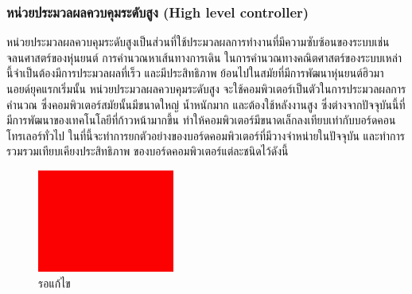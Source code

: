 \subsubsection*{หน่วยประมวลผลควบคุมระดับสูง (High level controller)}
หน่วยประมวลผลควบคุมระดับสูงเป็นส่วนที่ใช้ประมวลผลการทำงานที่มีความซับซ้อนของระบบเช่น
จลนศาสตร์ของหุ่นยนต์ การคำนวณหาเส้นทางการเดิน ในการคำนวณทางคณิตศาสตร์ของระบบเหล่านี้จำเป็นต้องมีการประมวลผลที่เร็ว
และมีประสิทธิภาพ ย้อนไปในสมัยที่มีการพัฒนาหุ่นยนต์ฮิวมานอยด์ยุคแรกเริ่มนั้น หน่วยประมวลผลควบคุมระดับสูง
จะใช้คอมพิวเตอร์เป็นตัวในการประมวลผลการคำนวณ ซึ่งคอมพิวเตอร์สมัยนั้นมีขนาดใหญ่ น้ำหนักมาก
และต้องใช้หลังงานสูง ซึ่งต่างจากปัจจุบันนี้ที่มีการพัฒนาของเทคโนโลยีที่ก้าวหน้ามากขึ้น
ทำให้คอมพิวเตอร์มีขนาดเล็กลงเทียบเท่ากับบอร์ดคอนโทรเลอร์ทั่วไป ในที่นี้จะทำการยกตัวอย่างของบอร์ดคอมพิวเตอร์ที่มีวางจำหน่ายในปัจจุบัน
และทำการรวมรวมเทียบเคียงประสิทธิภาพ ของบอร์ดคอมพิวเตอร์แต่ละชนิดไว้ดังนี้
\begin{figure}[htbp]
    \centering
    \includegraphics[width=0.40\textwidth]{chapter2/images/toedit.jpg}
    \caption{รอแก้ไข}
    \label{fig:toedit}
\end{figure}


